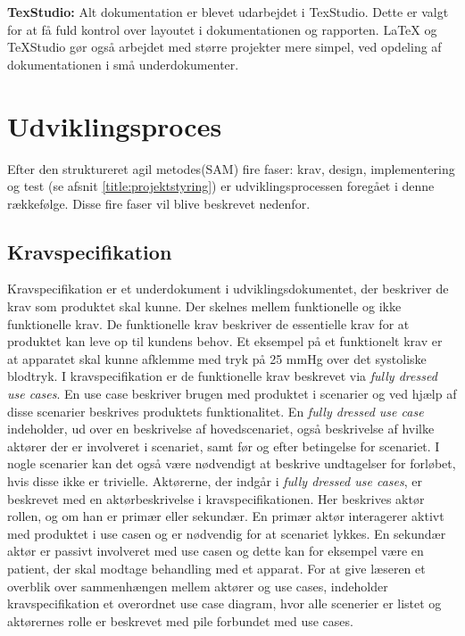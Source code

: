 \textbf{TexStudio:} Alt dokumentation er blevet udarbejdet i TexStudio. Dette er valgt for at få fuld kontrol over layoutet i dokumentationen og rapporten. LaTeX og TeXStudio gør også arbejdet med større projekter mere simpel, ved opdeling af dokumentationen i små underdokumenter.


\section{Udviklingsproces} \label{title:udviklingMetode}
Efter den struktureret agil metodes(SAM) fire faser: krav, design, implementering og test (se afsnit \ref{title:projektstyring}) er udviklingsprocessen foregået i denne rækkefølge. Disse fire faser vil blive beskrevet nedenfor.

	\subsection{Kravspecifikation} \label{title:kravspecifikation}
	Kravspecifikation er et underdokument i udviklingsdokumentet, der beskriver de krav som produktet skal kunne. Der skelnes mellem funktionelle og ikke funktionelle krav. De funktionelle krav beskriver de essentielle krav for at produktet kan leve op til kundens behov. Et eksempel på et funktionelt krav er at apparatet skal kunne afklemme med tryk på 25 mmHg over det systoliske blodtryk. I kravspecifikation er de funktionelle krav beskrevet via \textit{fully dressed use cases}. En use case beskriver brugen med produktet i scenarier og ved hjælp af disse scenarier beskrives produktets funktionalitet. En \textit{fully dressed use case} indeholder, ud over en beskrivelse af hovedscenariet, også beskrivelse af hvilke aktører der er involveret i scenariet, samt før og efter betingelse for scenariet. I nogle scenarier kan det også være nødvendigt at beskrive undtagelser for forløbet, hvis disse ikke er trivielle. Aktørerne, der indgår i \textit{fully dressed use cases}, er beskrevet med en aktørbeskrivelse i kravspecifikationen. Her beskrives aktør rollen, og om han er primær eller sekundær. En primær aktør interagerer aktivt med produktet i use casen og er nødvendig for at scenariet lykkes. En sekundær aktør er passivt involveret med use casen og dette kan for eksempel være en patient, der skal modtage behandling med et apparat. For at give læseren et overblik over sammenhængen mellem aktører og use cases, indeholder kravspecifikation et overordnet use case diagram, hvor alle scenerier er listet og aktørernes rolle er beskrevet med pile forbundet med use cases. 
	
